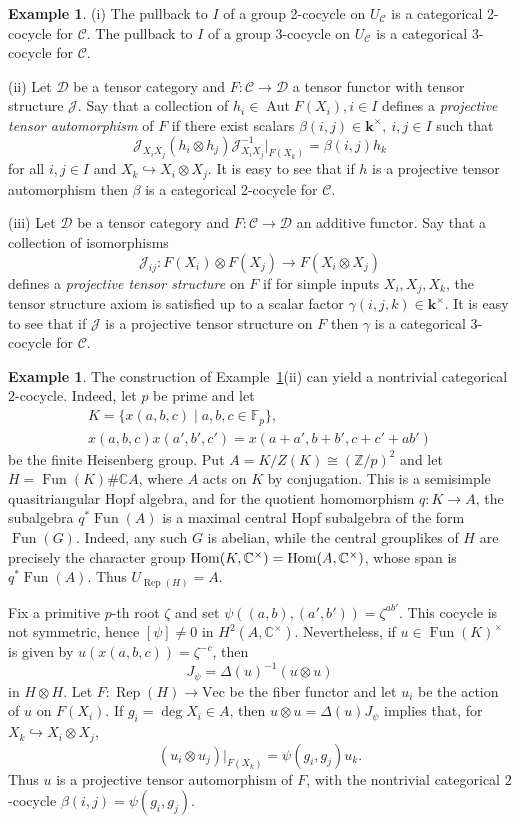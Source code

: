 \documentclass[12pt]{amsart}
\numberwithin{equation}{section}
\theoremstyle{definition}
\newtheorem{example}[theorem]{Example}
\newcommand{\Hom}{\text{Hom}}
\newcommand{\Aut}{\text{Aut}}
\newcommand{\Rep}{\text{Rep}}
\newcommand{\1}{_{(1)}}
\newcommand{\2}{_{(2)}}
\newcommand{\3}{_{(3)}}
\newcommand{\4}{_{(4)}}
\newcommand{\5}{_{(5)}}
\newcommand{\6}{_{(6)}}
\newcommand{\C}{\mathcal{C}}
\theoremstyle{plain}
\theoremstyle{definition}
\theoremstyle{remark}
\def\C{\mathcal{C}}
\def\D{\mathcal{D}}
\def\Aut{\mathop{\mathrm{Aut}}\nolimits}
\def\Hom{\mathrm{Hom}}
\def\Vec{\mathrm{Vec}}
\def\k{\mathbf{k}}
\def\Rep{\mathop{\mathrm{Rep}}\nolimits}
\begin{document}
\begin{example}\label{categorical-cocycle-examples} (i) The pullback to $I$ of a group 2-cocycle on $U_\C$ is a categorical 2-cocycle for $\C$. The pullback to $I$ of a group $3$-cocycle on $U_\C$ is a categorical 3-cocycle for $\C$. 

(ii) Let $\D$ be a tensor category and $F: \C\to \D$ a tensor functor with tensor structure $\mathcal J$. Say that a collection of $h_i\in \Aut F(X_i),i\in I$ defines a {\it 
projective tensor automorphism} of $F$ if there exist scalars $\beta(i,j)\in \k^\times,\ i,j\in I$ such that 
$$
\mathcal J_{X_iX_j}(h_i\otimes h_j)\mathcal J_{X_iX_j}^{-1}|_{F(X_k)}=\beta(i,j)h_k
$$ 
for all $i,j\in I$ and $X_k\hookrightarrow X_i\otimes X_j$. It is easy to see that 
if $h$ is a projective tensor automorphism then $\beta$ is a categorical 2-cocycle for $\C$. 

(iii) Let $\D$ be a tensor category and $F: \C\to \D$ an additive functor. 
Say that a collection of isomorphisms 
$$
\mathcal J_{ij}: F(X_i)\otimes F(X_j)\to F(X_i\otimes X_j)
$$ 
defines a {\it projective tensor structure} on $F$ if for simple inputs $X_i,X_j,X_k$, the tensor structure axiom is satisfied up to a scalar factor $\gamma(i,j,k)\in \k^\times$. It is easy to see that 
if $\mathcal J$ is a projective tensor structure on $F$ then $\gamma$ is a categorical 3-cocycle for $\C$.
\end{example} 

\begin{example}\label{heisenberg-categorical-cocycle}
The construction of Example~\ref{categorical-cocycle-examples}(ii) can yield a nontrivial categorical $2$-cocycle. Indeed, let $p$ be prime and let
\[
\begin{gathered}
K=\{x(a,b,c)\mid a,b,c\in\mathbb F_p\},\\
x(a,b,c)x(a',b',c')=x(a+a',b+b',c+c'+ab')
\end{gathered}
\]
be the finite Heisenberg group. Put $A=K/Z(K)\cong(\mathbb Z/p)^2$ and let
$H=\operatorname{Fun}(K)\#\mathbb C A$, where $A$ acts on $K$ by conjugation. This is a semisimple quasitriangular Hopf algebra, and for the quotient homomorphism $q:K\to A$, the subalgebra $q^*\operatorname{Fun}(A)$ is a maximal central Hopf subalgebra of the form $\operatorname{Fun}(G)$. Indeed, any such $G$ is abelian, while the central grouplikes of $H$ are precisely the character group $\Hom(K,\Bbb C^\times)=\Hom(A,\Bbb C^\times)$, whose span is $q^*\operatorname{Fun}(A)$. Thus $U_{\Rep(H)}=A$.

Fix a primitive $p$-th root $\zeta$ and set
$\psi((a,b),(a',b'))=\zeta^{ab'}$. This cocycle is not symmetric, hence $[\psi]\ne0$ in $H^2(A,\mathbb C^\times)$. Nevertheless, if $u\in\operatorname{Fun}(K)^\times$ is given by $u(x(a,b,c))=\zeta^{-c}$, then
\[
J_\psi=\Delta(u)^{-1}(u\otimes u)
\]
in $H\otimes H$. Let $F:\Rep(H)\to\Vec$ be the fiber functor and let $u_i$ be the action of $u$ on $F(X_i)$. If $g_i=\deg X_i\in A$, then $u\otimes u=\Delta(u)J_\psi$ implies that, for $X_k\hookrightarrow X_i\otimes X_j$,
\[
(u_i\otimes u_j)|_{F(X_k)}=\psi(g_i,g_j)u_k.
\]
Thus $u$ is a projective tensor automorphism of $F$, with the nontrivial categorical $2$-cocycle $\beta(i,j)=\psi(g_i,g_j)$.
\end{example}
\end{document}
